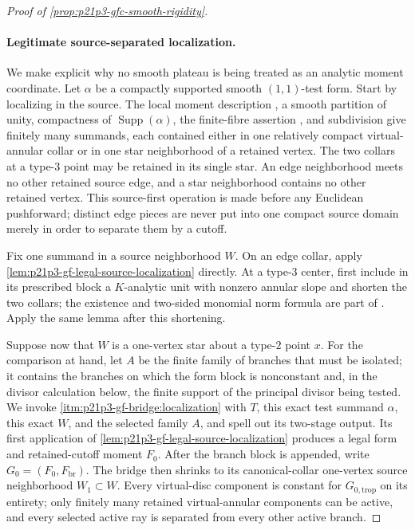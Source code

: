 \begin{proof}[Proof of \cref{prop:p21p3-gfc-smooth-rigidity}]
\paragraph{Legitimate source-separated localization.}
We make explicit why no smooth plateau is being treated as an analytic
moment coordinate.  Let $\alpha$ be a compactly supported smooth
$(1,1)$-test form.  Start by localizing in the source.  The local moment
description \cite[Proposition~15.1.1(b)]{CLD25}, a smooth partition of
unity, compactness of $\operatorname{Supp}(\alpha)$, the finite-fibre
assertion \cite[Corollary~3.18]{GJR26}, and subdivision give finitely many
summands, each contained either in one relatively compact
virtual-annular collar or in one star neighborhood of a retained vertex.
The two collars at a type-$3$ point may be retained in its single star.
An edge neighborhood meets no other retained source edge, and a star
neighborhood contains no other retained vertex.  This source-first
operation is made before any Euclidean pushforward; distinct edge pieces
are never put into one compact source domain merely in order to separate
them by a cutoff.

Fix one summand in a source neighborhood $W$.  On an edge collar, apply
\cref{lem:p21p3-gf-legal-source-localization} directly.  At a type-$3$
center, first include in its prescribed block a $K$-analytic unit with
nonzero annular slope and shorten the two collars; the existence and
two-sided monomial norm formula are part of
\cite[\S\S4.2.11.2 and 4.3.9--4.3.10]{Ducros24CurveStructure}.  Apply the
same lemma after this shortening.

Suppose now that $W$ is a one-vertex star about a type-$2$ point $x$.
For the comparison at hand, let $A$ be the finite family of branches that
must be isolated; it contains the branches on which the form block is
nonconstant and, in the divisor calculation below, the finite support of
the principal divisor being tested.  We invoke
\cref{itm:p21p3-gf-bridge:localization} with $T$, this exact test summand
$\alpha$, this exact $W$, and the selected family $A$, and spell out its
two-stage output.  Its first application of
\cref{lem:p21p3-gf-legal-source-localization} produces a legal form and
retained-cutoff moment $F_0$.  After the branch block is appended, write
$G_0=(F_0,F_{\mathrm{br}})$.  The bridge then shrinks to its canonical-collar
one-vertex source neighborhood $W_1\subset W$.  Every virtual-disc
component is constant for $G_{0,\mathrm{trop}}$ on its entirety; only
finitely many retained virtual-annular components can be active, and every
selected active ray is separated from every other active branch.


\end{proof}
